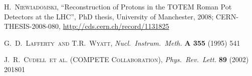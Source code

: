 \documentclass[3p,onecolumn,12pt,times,longtitle]{elsarticle}
\def\etal{et al.}
\def\Name#1{\textsc{#1}, }
\def\REVIEW#1#2#3#4{{\it #1} {\bf #2} (#3) #4}
\begin{document}
\begin{thebibliography}{99}
	\Name{H.~Niewiadomski}
	``Reconstruction of Protons in the TOTEM Roman Pot Detectors at the LHC'',
    PhD thesis, University of Manchester, 2008;
    CERN-THESIS-2008-080,
	\url{http://cds.cern.ch/record/1131825}

	\Name{G.~D.~Lafferty~and T.R.~Wyatt}
	\REVIEW{Nucl.\ Instrum.\ Meth.}{A 355}{1995}{541}

	\Name{J.~R.~Cudell~\etal{} (COMPETE Collaboration)}
	\REVIEW{Phys.\ Rev.\ Lett.}{89}{2002}{201801}

\end{thebibliography}
\end{document}
